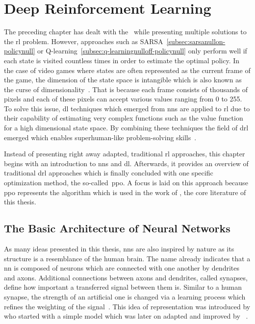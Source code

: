 \documentclass[draft,final]{vutinfth} %
\newcommand{\p}[1]{see p. #1}
\begin{document}
    \glsresetall


    \chapter{Deep Reinforcement Learning}\label{ch:deep-reinforcement-learning}


    The preceding chapter has dealt with the~ while presenting multiple solutions to the \gls{rl} problem.
    However, approaches such as SARSA~\eqref{subsec:sarsanullon-policynull} or Q-learning~\eqref{subsec:q-learningnulloff-policynull} only perform well if each state is visited countless times in order to estimate the optimal policy.
    In the case of video games where states are often represented as the current frame of the game, the dimension of the state space is intangible which is also known as the curse of dimensionality~\citep[\p{151}]{goodfellow_deep_2016}.
    That is because each frame consists of thousands of pixels and each of these pixels can accept various values ranging from 0 to 255.
    To solve this issue, \gls{dl} techniques which emerged from \glspl{nn} are applied to \gls{rl} due to their capability of estimating very complex functions such as the value function for a high dimensional state space.
    By combining these techniques the field of \gls{drl} emerged which enables superhuman-like problem-solving skills~\citep{francois-lavet_introduction_2018}.

    Instead of presenting right away adapted, traditional \gls{rl} approaches, this chapter begins with an introduction to \glspl{nn} and \gls{dl}.
    Afterwards, it provides an overview of traditional \gls{drl} approaches which is finally concluded with one specific optimization method, the so-called~\gls{ppo}.
    A focus is laid on this approach because \gls{ppo} represents the algorithm which is used in the work of \citet{burda_large-scale_2018-1}, the core literature of this thesis.


    \section{The Basic Architecture of Neural Networks}\label{subsec:the-basic-architecture-of-neural-networks}


    As many ideas presented in this thesis, \glspl{nn} are also inspired by nature as its structure is a resemblance of the human brain.
    The name already indicates that a \gls{nn} is composed of neurons which are connected with one another by dendrites and axons.
    Additional connections between axons and dendrites, called synapses, define how important a transferred signal between them is.
    Similar to a human synapse, the strength of an artificial one is changed via a learning process which refines the weighting of the signal~\citep[\p{1f}]{aggarwal_neural_2018}.
    This idea of representation was introduced by \citeauthor{mcculloch_logical_1943} who started with a simple model which was later on adapted and improved by \citeauthor{rosenblatt_perceptron_1957}~\citep[\p{167}]{awad_deep_2015}.
\end{document}
